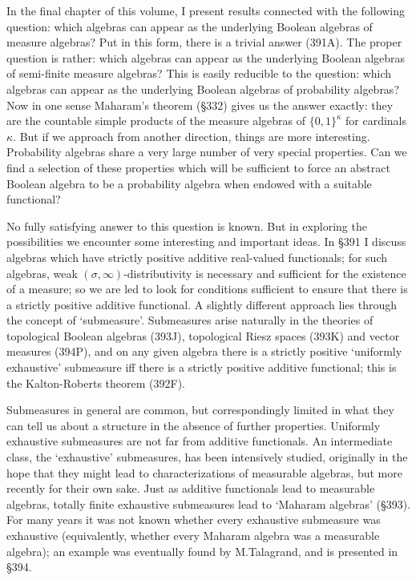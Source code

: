  
\def\chaptername{Measurable algebras} 
 
 
In the final chapter of this volume, I present results connected with 
the following question:  which algebras can appear as the underlying 
Boolean algebras of measure algebras?   Put in this form, there is a 
trivial answer (391A).   The proper question is rather:  which algebras 
can appear as the underlying Boolean algebras of semi-finite measure 
algebras?   This is easily reducible to the question:  which algebras 
can appear as the underlying Boolean algebras of probability algebras? 
Now in one sense Maharam's theorem (\S332) gives us the answer exactly: 
they are the countable simple products of the measure algebras of 
$\{0,1\}^{\kappa}$ for cardinals $\kappa$.   But if we approach from 
another direction, things are more interesting.   Probability algebras 
share a very large number of very special properties.   Can we find a 
selection of these properties which will be sufficient to force an 
abstract Boolean algebra to be a probability 
algebra when endowed with a suitable functional? 
 
No fully satisfying answer to this question is known.   But in exploring 
the possibilities we encounter some interesting and important ideas. 
In \S391 I discuss algebras which have strictly positive additive 
real-valued functionals;  for such algebras, weak 
$(\sigma,\infty)$-distributivity is necessary and sufficient for the 
existence of a measure;  so we are led to look for conditions sufficient 
to ensure that there is a strictly positive additive functional.   A 
slightly different approach lies through the concept of `submeasure'. 
Submeasures arise naturally in the theories of topological Boolean 
algebras (393J), topological Riesz spaces (393K) and vector measures 
(394P), and on any given algebra there is a strictly positive 
`uniformly exhaustive' 
submeasure iff there is a strictly positive additive functional;  this 
is the Kalton-Roberts theorem (392F).    
 
Submeasures in general are common, but correspondingly limited in what they 
can tell us about a structure in the absence of further properties.   
Uniformly exhaustive submeasures are not far from additive functionals. 
An intermediate class, the `exhaustive' submeasures, has been intensively 
studied, originally in the hope that they might lead to characterizations 
of measurable algebras, but more recently for their own sake.   Just as 
additive functionals lead to measurable algebras, totally 
finite exhaustive submeasures lead to `Maharam algebras' (\S393).   For 
many years it was not known whether every exhaustive submeasure was 
exhaustive (equivalently, whether every Maharam algebra was a measurable 
algebra);  an example was eventually found by M.Talagrand, and is presented 
in \S394.
 
